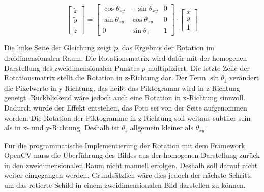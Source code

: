 \begin{equation}
    \begin{bmatrix} \tilde{x} \\ \tilde{y} \\ \tilde{z} \end{bmatrix}
    =
    \begin{bmatrix}
        \cos{\theta_{xy}} & -\sin{\theta_{xy}} & 0\\
        \sin{\theta_{xy}} & \cos{\theta_{xy}} & 0\\
        0                 & \sin{\theta_{z}} & 1
    \end{bmatrix}
    \cdot \begin{bmatrix} x \\ y \\ 1 \end{bmatrix}
\end{equation}

Die linke Seite der Gleichung zeigt $\tilde{p}$, das Ergebnis der Rotation im dreidimensionalen Raum. Die Rotationsmatrix wird dafür mit der homogenen Darstellung des zweidimensionalen Punktes $p$ multipliziert. Die letzte Zeile der Rotationsmatrix stellt die Rotation in z-Richtung dar. Der Term $\sin{\theta_{z}}$ verändert die Pixelwerte in y-Richtung, das heißt das Piktogramm wird in z-Richtung geneigt. Rückblickend wäre jedoch auch eine Rotation in x-Richtung sinnvoll. Dadurch würde der Effekt entstehen, das Foto sei von der Seite aufgenommen worden. Die Rotation der Piktogramme in z-Richtung soll weitaus subtiler sein als in x- und y-Richtung. Deshalb ist $\theta_{z}$ allgemein kleiner als $\theta_{xy}$. \cite{geometric-ops}

Für die programmatische Implementierung der Rotation mit dem Framework OpenCV muss die Überführung des Bildes aus der homogenen Darstellung zurück in den zweidimensionalen Raum nicht manuell erfolgen. Deshalb soll darauf nicht weiter eingegangen werden. Grundsätzlich wäre dies jedoch der nächste Schritt, um das rotierte Schild in einem zweidimensionalen Bild darstellen zu können.


